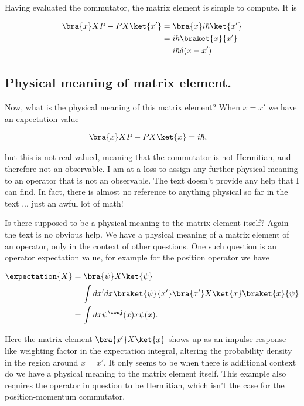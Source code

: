 Having evaluated the commutator, the matrix element is simple to compute.  It is

\begin{align*}
\bra{x} XP - PX \ket{x'}
&=
\bra{x} i \hbar \ket{x'} \\
&=
i \hbar \braket{x}{x'} \\
&=
i \hbar \delta(x - x')
\end{align*}

\subsection{Physical meaning of matrix element.}

Now, what is the physical meaning of this matrix element?  When $x = x'$ we have an expectation value

\begin{align*}
\bra{x} XP - PX \ket{x} &= i \hbar,
\end{align*}

but this is not real valued, meaning that the commutator is not Hermitian, and therefore not an observable.  I am at a loss to assign any further physical meaning to an operator that is not an observable.  The text doesn't provide any help that I can find.  In fact, there is almost no reference to anything physical so far in the text ... just an awful lot of math!

Is there supposed to be a physical meaning to the matrix element itself?  Again the text is no obvious help.  We have a physical meaning of a matrix element of an operator, only in the context of other questions.  One such question is an operator expectation value, for example for the position operator we have

\begin{align*}
\expectation{X}
&=
\bra{\psi} X \ket{\psi} \\
&=
\int dx' dx \braket{\psi}{x'} \bra{x'} X \ket{x} \braket{x}{\psi} \\
&=
\int dx \psi^\conj(x) x \psi(x).
\end{align*}

Here the matrix element $\bra{x'} X \ket{x}$ shows up as an impulse response like weighting factor in the expectation integral, altering the probability density in the region around $x = x'$.  It only seems to be when there is additional context do we have a physical meaning to the matrix element itself.  This example also requires the operator in question to be Hermitian, which isn't the case for the position-momentum commutator.

